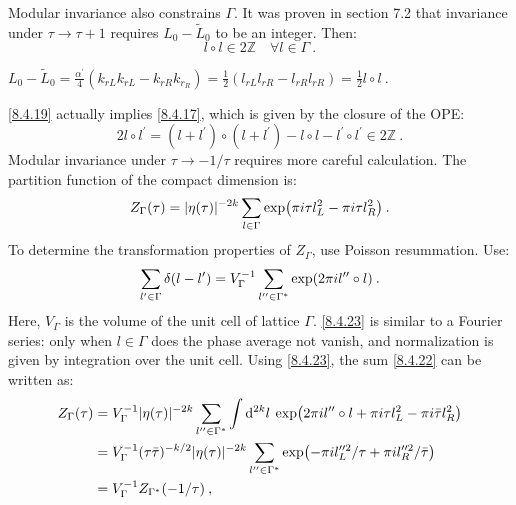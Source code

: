 Modular invariance also constrains $\Gamma $. 
It was proven in section 7.2 that invariance under $\tau \rightarrow \tau+1$ requires $L_{0}-\tilde{L}_{0}$ to be an integer. Then:
\begin{equation}
	l \vysmwhtcircle l \in 2 \mathds{Z} \quad \forall l \in \Gamma \:. \label{8.4.19}
\end{equation}
\begin{tcolorbox}
	\begin{remark}
		$L_0-\tilde{L}_0=\frac{\alpha^{\prime}}{4}(k_{r L} k_{r L}-k_{r R} k_{r_{R}})
		=\frac{1}{2}(l_{rL}l_{r R}-l_{r R} l_{rR})=\frac{1}{2} l \vysmwhtcircle l \:. \label{8.4.20}$ 
	\end{remark}
\end{tcolorbox}
\noindent \eqref{8.4.19} actually implies \eqref{8.4.17}, which is given by the closure of the OPE:
\begin{equation}
	2 l \vysmwhtcircle l^{\prime}=(l+l^{\prime}) \vysmwhtcircle (l+l^{\prime})-l \vysmwhtcircle l-l^{\prime} \vysmwhtcircle l^{\prime} \in 2 \mathds{Z} \:. \label{8.4.21}
\end{equation}
Modular invariance under $\tau \rightarrow-1 / \tau$ requires more careful calculation. The partition function of the compact dimension is:
\begin{equation}
	Z_{\Gamma}(\tau)=|\eta(\tau)|^{-2 k} \sum_{l \in \Gamma} \exp (\pi i \tau l_{L}^{2}-\pi i \tau l_{R}^{2}) \:. \label{8.4.22}
\end{equation}
To determine the transformation properties of $Z_{\Gamma}$, use Poisson resummation. Use:
\begin{equation}
	\sum_{l^{\prime} \in \Gamma} \delta(l-l^{\prime})=V_{\Gamma}^{-1} \sum_{l^{\prime \prime} \in \Gamma^{*}} 
	\exp (2 \pi i l^{\prime \prime}  \circ l) \:. \label{8.4.23}
\end{equation}
Here, $V_{\Gamma}$ is the volume of the unit cell of lattice $\Gamma$. \eqref{8.4.23} is similar to a Fourier series: only when $l \in \Gamma$ does the phase average not vanish, and normalization is given by integration over the unit cell. 
Using \eqref{8.4.23}, the sum \eqref{8.4.22} can be written as:
\begin{align}
	Z_{\Gamma}(\tau) &=V_{\Gamma}^{-1}|\eta(\tau)|^{-2 k} \sum_{l^{\prime \prime} \in \Gamma^{*}} 
	\int \mathrm{d}^{2 k} l \: \exp (2 \pi i l^{\prime \prime} \circ l+ \pi i \tau l_{L}^{2} 
	-\pi i \bar{\tau} l_{R}^{2}) \nonumber \\
	&=V_{\Gamma}^{-1}(\tau \bar{\tau})^{-k / 2}|\eta(\tau)|^{-2 k} \sum_{l^{\prime \prime} \in \Gamma^{*}} 
	\exp (-\pi i l_{L}^{\prime \prime 2} / \tau+\pi i l_{R}^{\prime \prime 2} / \bar{\tau}) \nonumber \\
	&=V_{\Gamma}^{-1} Z_{\Gamma^{*}}(-1 / \tau) \:, \label{8.4.24}
\end{align}
